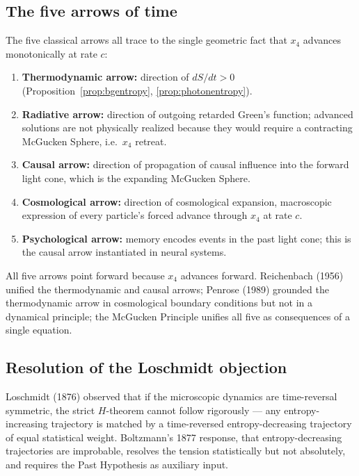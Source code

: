 \documentclass[11pt,a4paper]{article}
\begin{document}
\subsection{The five arrows of time}

The five classical arrows all trace to the single geometric fact that $x_4$ advances monotonically at rate $c$:

\begin{enumerate}
\item \textbf{Thermodynamic arrow:} direction of $dS/dt > 0$ (Proposition~\ref{prop:bgentropy}, \ref{prop:photonentropy}).
\item \textbf{Radiative arrow:} direction of outgoing retarded Green's function; advanced solutions are not physically realized because they would require a contracting McGucken Sphere, i.e.\ $x_4$ retreat.
\item \textbf{Causal arrow:} direction of propagation of causal influence into the forward light cone, which is the expanding McGucken Sphere.
\item \textbf{Cosmological arrow:} direction of cosmological expansion, macroscopic expression of every particle's forced advance through $x_4$ at rate $c$.
\item \textbf{Psychological arrow:} memory encodes events in the past light cone; this is the causal arrow instantiated in neural systems.
\end{enumerate}

All five arrows point forward because $x_4$ advances forward. Reichenbach (1956) unified the thermodynamic and causal arrows; Penrose (1989) grounded the thermodynamic arrow in cosmological boundary conditions but not in a dynamical principle; the McGucken Principle unifies all five as consequences of a single equation.

\subsection{Resolution of the Loschmidt objection}

Loschmidt (1876) observed that if the microscopic dynamics are time-reversal symmetric, the strict $H$-theorem cannot follow rigorously --- any entropy-increasing trajectory is matched by a time-reversed entropy-decreasing trajectory of equal statistical weight. Boltzmann's 1877 response, that entropy-decreasing trajectories are improbable, resolves the tension statistically but not absolutely, and requires the Past Hypothesis as auxiliary input.
\end{document}
